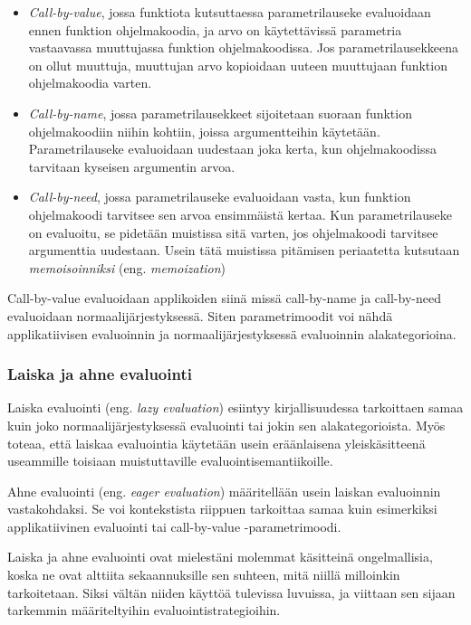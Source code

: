 \begin{itemize}
	\item \textit{Call-by-value}, jossa funktiota kutsuttaessa parametrilauseke evaluoidaan ennen funktion ohjelmakoodia, ja arvo on käytettävissä parametria vastaavassa muuttujassa funktion ohjelmakoodissa. Jos parametrilausekkeena on ollut muuttuja, muuttujan arvo kopioidaan uuteen muuttujaan funktion ohjelmakoodia varten.
    \item \textit{Call-by-name}, jossa parametrilausekkeet sijoitetaan suoraan funktion ohjelmakoodiin niihin kohtiin, joissa argumentteihin käytetään. Parametrilauseke evaluoidaan uudestaan joka kerta, kun ohjelmakoodissa tarvitaan kyseisen argumentin arvoa.
    \item \textit{Call-by-need}, jossa parametrilauseke evaluoidaan vasta, kun funktion ohjelmakoodi tarvitsee sen arvoa ensimmäistä kertaa. Kun parametrilauseke on evaluoitu, se pidetään muistissa sitä varten, jos ohjelmakoodi tarvitsee argumenttia uudestaan. Usein tätä muistissa pitämisen periaatetta kutsutaan \textit{memoisoinniksi} (eng. \textit{memoization})
\end{itemize}

Call-by-value evaluoidaan applikoiden siinä missä call-by-name ja call-by-need evaluoidaan normaalijärjestyksessä. Siten parametrimoodit voi nähdä applikatiivisen evaluoinnin ja normaalijärjestyksessä evaluoinnin alakategorioina.

\subsubsection{Laiska ja ahne evaluointi}

Laiska evaluointi (eng. \textit{lazy evaluation}) esiintyy kirjallisuudessa tarkoittaen samaa kuin joko normaalijärjestyksessä evaluointi tai jokin sen alakategorioista. Myös \citet{scott2009programming} toteaa, että laiskaa evaluointia käytetään usein eräänlaisena yleiskäsitteenä useammille toisiaan muistuttaville evaluointisemantiikoille.

Ahne evaluointi (eng. \textit{eager evaluation}) määritellään usein laiskan evaluoinnin vastakohdaksi. Se voi kontekstista riippuen tarkoittaa samaa kuin esimerkiksi applikatiivinen evaluointi tai call-by-value -parametrimoodi.

Laiska ja ahne evaluointi ovat mielestäni molemmat käsitteinä ongelmallisia, koska ne ovat alttiita sekaannuksille sen suhteen, mitä niillä milloinkin tarkoitetaan. Siksi vältän niiden käyttöä tulevissa luvuissa, ja viittaan sen sijaan tarkemmin määriteltyihin evaluointistrategioihin.




